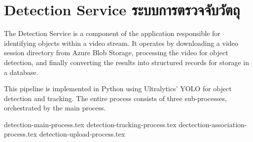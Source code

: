 \section{\ifenglish Detection Service \else ระบบการตรวจจับวัตถุ \fi}
The Detection Service is a component of the application responsible for identifying objects within a video stream. It operates by downloading a video session directory from Azure Blob Storage, processing the video for object detection, and finally converting the results into structured records for storage in a database. 

This pipeline is implemented in Python using Ultralytics' YOLO for object detection and tracking. The entire process consists of three sub-processes, orchestrated by the main process.

\newcommand{\detectionDir}{chapters/approach/detection}
{detection-main-process.tex}
{detection-tracking-process.tex}
{dectection-association-process.tex}
{detection-upload-process.tex}
